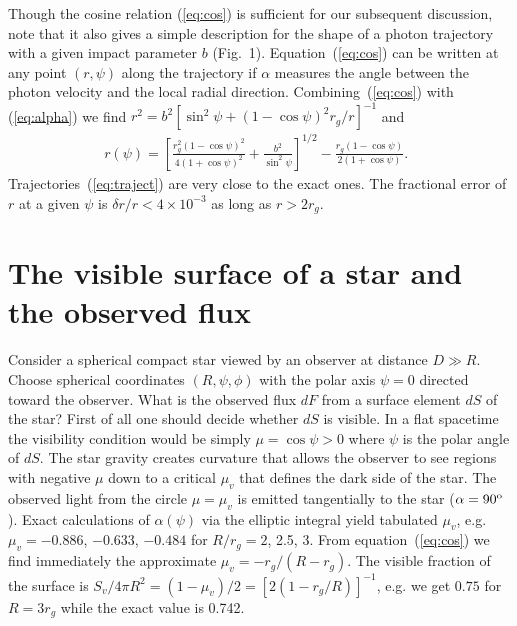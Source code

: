 \documentclass{article}
\def\dd{{ d}}
\def\dg{{\rm o}}
\begin{document}
Though the cosine relation (\ref{eq:cos}) is sufficient for our subsequent 
discussion, note that it also gives a simple description for the shape of 
a photon trajectory with a given impact parameter $b$ (Fig.~1). 
Equation~(\ref{eq:cos}) can be written at any point $(r,\psi)$ along the 
trajectory if $\alpha$ measures the angle between the photon velocity and 
the local radial direction. Combining~(\ref{eq:cos}) with (\ref{eq:alpha})
we find $r^2=b^2[\sin^2\psi+(1-\cos\psi)^2r_g/r]^{-1}$ and
\begin{eqnarray}
\label{eq:traject}
  r(\psi)=\left[\frac{r_g^2(1-\cos\psi)^2}{4(1+\cos\psi)^2}
  +\frac{b^2}{\sin^2\psi}\right]^{1/2} -\frac{r_g(1-\cos\psi)}{2(1+\cos\psi)}. 
  \;\;
\end{eqnarray}
Trajectories~(\ref{eq:traject}) are very close to the exact ones.
The fractional error of $r$ at a given $\psi$ is 
$\delta r/r<4\times 10^{-3}$ as long as $r>2r_g$. 




\section{The visible surface of a star and the observed flux}  


Consider a spherical compact star viewed by an observer at distance $D\gg R$.
Choose spherical coordinates $(R,\psi,\phi)$ with the polar axis $\psi=0$
directed toward the observer. What is the observed flux $\dd F$ from a surface 
element $\dd S$ of the star? First of all one should decide whether $\dd S$ is 
visible.  In a flat spacetime the visibility condition would be simply 
$\mu=\cos\psi>0$ where $\psi$ is the polar angle of $\dd S$. The star gravity 
creates curvature that allows the observer to see regions with negative $\mu$
down to a critical $\mu_v$ that defines the dark side of the star. The 
observed light from the circle $\mu=\mu_v$ is emitted tangentially to the 
star ($\alpha=90^\dg$). Exact calculations of $\alpha(\psi)$ via the elliptic 
integral yield tabulated $\mu_v$, e.g. $\mu_v=-0.886$, $-0.633$, $-0.484$ 
for $R/r_g=2$, 2.5, 3. From equation~(\ref{eq:cos}) we find immediately
the approximate $\mu_v=-r_g/(R-r_g)$. The visible fraction of the surface
is $S_v/4\pi R^2=(1-\mu_v)/2=[2(1-r_g/R)]^{-1}$, e.g. we get $0.75$ for
$R=3r_g$ while the exact value is 0.742.
\end{document}
